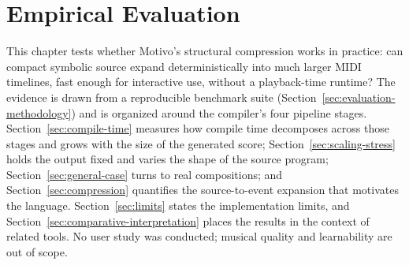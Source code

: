 \chapter{Empirical Evaluation}\label{ch:evaluation}

This chapter tests whether Motivo's structural compression works in practice: can compact symbolic source expand
deterministically into much larger MIDI timelines, fast enough for interactive use, without a playback-time runtime?
The evidence is drawn from a reproducible benchmark suite (Section~\ref{sec:evaluation-methodology}) and is organized
around the compiler's four pipeline stages.
Section~\ref{sec:compile-time} measures how compile time decomposes across those stages and grows with the size of the
generated score; Section~\ref{sec:scaling-stress} holds the output fixed and varies the shape of the source program;
Section~\ref{sec:general-case} turns to real compositions; and Section~\ref{sec:compression} quantifies the
source-to-event expansion that motivates the language.
Section~\ref{sec:limits} states the implementation limits, and Section~\ref{sec:comparative-interpretation} places the
results in the context of related tools.
No user study was conducted; musical quality and learnability are out of scope.









